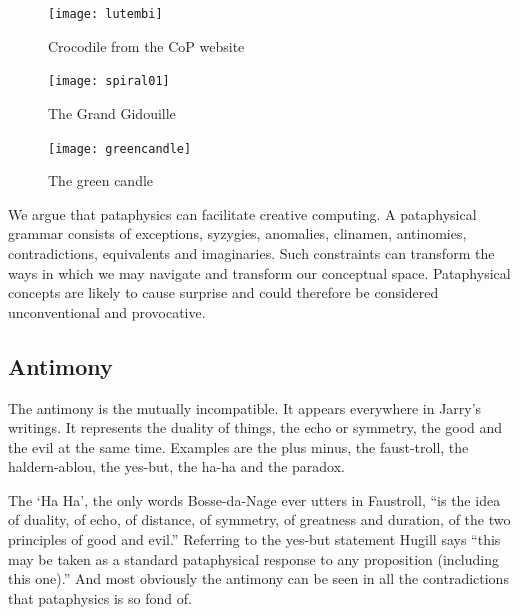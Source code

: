 \begin{figure}[htb]
  \centering
  \begin{minipage}{.275\linewidth}
    \texttt{[image: lutembi]}
  \caption[Crocodile]{Crocodile from the CoP website}
\label{img1}
  \end{minipage}
  \hspace{.05\linewidth}
  \begin{minipage}{.275\linewidth}
    \texttt{[image: spiral01]}
  \caption[Gidouille]{\raggedleft The Grand Gidouille}
\label{img2}
  \end{minipage}
  \hspace{.05\linewidth}
  \begin{minipage}{.275\linewidth}
    \texttt{[image: greencandle]}
  \caption[Green Candle]{The green candle}
\label{img3}
  \end{minipage}
\end{figure}

\begin{draft}
  We argue that pataphysics can facilitate creative computing. A pataphysical grammar consists of exceptions, syzygies, anomalies, clinamen, antinomies, contradictions, equivalents and imaginaries. Such constraints can transform the ways in which we may navigate and transform our conceptual space. Pataphysical concepts are likely to cause surprise and could therefore be considered unconventional and provocative.
\end{draft}


\subsection{Antimony}

The antimony is the mutually incompatible. It appears everywhere in Jarry's writings. It represents the duality of things, the echo or symmetry, the good and the evil at the same time. Examples are the plus minus, the faust-troll, the haldern-ablou, the yes-but, the ha-ha and the paradox.

The `Ha Ha', the only words Bosse-da-Nage ever utters in Faustroll, ``is the idea of duality, of echo, of distance, of symmetry, of greatness and duration, of the two principles of good and evil.'' \autocite{Hugill2012a} Referring to the yes-but statement Hugill says ``this may be taken as a standard pataphysical response to any proposition (including this one).'' And most obviously the antimony can be seen in all the contradictions that pataphysics is so fond of.

